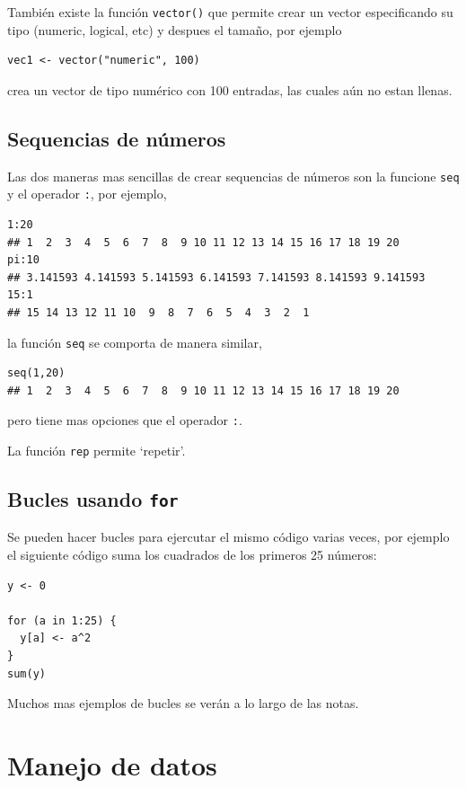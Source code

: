 \documentclass[fleqn,leqno,draft,10pt]{article}
\begin{document}
También existe la función \lstinline|vector()| que permite crear un vector especificando su tipo (numeric, logical, etc) y despues el tamaño, por ejemplo
\begin{lstlisting}
vec1 <- vector("numeric", 100)
\end{lstlisting}
crea un vector de tipo numérico con 100 entradas, las cuales aún no estan llenas.

\subsection{Sequencias de números}%
\label{sub:Sequencias de números}

Las dos maneras mas sencillas de crear sequencias de números son la funcione \lstinline|seq| y el operador \lstinline|:|,
por ejemplo,
\begin{lstlisting}
1:20
## 1  2  3  4  5  6  7  8  9 10 11 12 13 14 15 16 17 18 19 20
pi:10
## 3.141593 4.141593 5.141593 6.141593 7.141593 8.141593 9.141593
15:1
## 15 14 13 12 11 10  9  8  7  6  5  4  3  2  1
\end{lstlisting}
la función \lstinline|seq| se comporta de manera similar,
\begin{lstlisting}
seq(1,20)
## 1  2  3  4  5  6  7  8  9 10 11 12 13 14 15 16 17 18 19 20
\end{lstlisting}
pero tiene mas opciones que el operador \lstinline|:|. 

La función \lstinline|rep| permite `repetir'.

\subsection{Bucles usando \lstinline|for| }%

Se pueden hacer bucles para ejercutar el mismo código varias veces, por ejemplo el siguiente código suma los cuadrados de los primeros 25 números:
\begin{lstlisting}
y <- 0

for (a in 1:25) {
  y[a] <- a^2
}
sum(y)
\end{lstlisting}

Muchos mas ejemplos de bucles se verán a lo largo de las notas.

\section{Manejo de datos}%
\label{sec:Manejo de datos}
\end{document}

